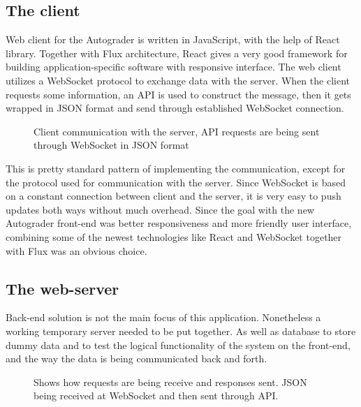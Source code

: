 \subsection{The client}
Web client for the Autograder is written in JavaScript, with the help of React library. Together with Flux architecture, React gives a very good framework for building application-specific software with responsive interface. The web client utilizes a WebSocket protocol to exchange data with the server. When the client requests some information, an API is used to construct the message, then it gets wrapped in JSON format and send through established WebSocket connection.
\begin{figure}[h]
  \scalebox{1}{}
  \caption{Client communication with the server, API requests are being sent through WebSocket in JSON format}
  \label{fig:clientoverview}
\end{figure}
This is pretty standard pattern of implementing the communication, except for the protocol used for communication with the server. Since WebSocket is based on a constant connection between client and the server, it is very easy to push updates both ways without much overhead. Since the goal with the new Autograder front-end was better responsiveness and more friendly user interface, combining some of the newest technologies like React and WebSocket together with Flux was an obvious choice.

\subsection{The web-server}

Back-end solution is not the main focus of this application. Nonetheless a working temporary server needed to be put together. As well as database to store dummy data and to test the logical functionality of the system on the front-end, and the way the data is being communicated back and forth.
\begin{figure}[h]
  \scalebox{1}{}
  \caption{Shows how requests are being receive and responses sent. JSON being received at WebSocket and then sent through API.}
  \label{fig:serveroverview}
\end{figure}

